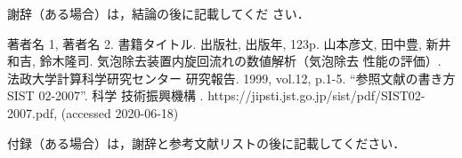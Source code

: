 \documentclass{brccms-hu}
\begin{document}
\begin{figure}[htb]
\centering
\caption{}
\ecaption{}
\end{figure}

\Acknowledgement %
謝辞（ある場合）は，結論の後に記載してくだ
さい．
\begin{thebibliography}{9}%
 著者名 1, 著者名 2. 書籍タイトル. 出版社,
出版年, 123p.
 山本彦文, 田中豊, 新井和吉, 鈴木隆司. 
気泡除去装置内旋回流れの数値解析（気泡除去
性能の評価）. 法政大学計算科学研究センター
研究報告. 1999, vol.12, p.1-5.
 “参照文献の書き方 SIST 02-2007”. 科学
技術振興機構 . https://jipsti.jst.go.jp/sist/pdf/SIST02-
2007.pdf, (accessed 2020-06-18)

\end{thebibliography}

\appendix
付録（ある場合）は，謝辞と参考文献リストの後に記載してください．
\end{document}
